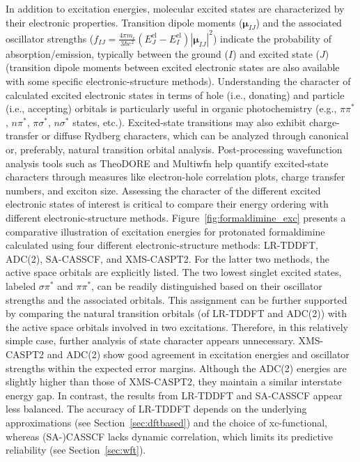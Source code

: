 \documentclass[9pt,bestpractices,pubversion]{livecoms}
\begin{document}
In addition to excitation energies, molecular excited states are characterized by their electronic properties. Transition dipole moments ($\boldsymbol{\mu}_{IJ}$) and the associated oscillator strengths ($f_{IJ}=\frac{4 \pi m_e }{3 \hbar e^2} (E_J^{\text{el}}-E_I^{\text{el}}) |\boldsymbol{\mu}_{IJ}|^2$) indicate the probability of absorption/emission, typically between the ground ($I$) and excited state ($J$) (transition dipole moments between excited electronic states are also available with some specific electronic-structure methods\cite{jacquemin2025betweenes}). Understanding the character of calculated excited electronic states in terms of hole (i.e., donating) and particle (i.e., accepting) orbitals is particularly useful in organic photochemistry (e.g., $\pi\pi^\ast$, $n\pi^\ast$, $\pi\sigma^\ast$, $n\sigma^\ast$ states, etc.). Excited-state transitions may also exhibit charge-transfer or diffuse Rydberg characters, which can be analyzed through canonical or, preferably, natural transition orbital analysis. Post-processing wavefunction analysis tools such as TheoDORE\cite{plasser2020theodore} and Multiwfn\cite{lu2024comprehensive} help quantify excited-state characters through measures like electron-hole correlation plots, charge transfer numbers, and exciton size. Assessing the character of the different excited electronic states of interest is critical to compare their energy ordering with different electronic-structure methods.
Figure~\ref{fig:formaldimine_exc} presents a comparative illustration of excitation energies for protonated formaldimine calculated using four different electronic-structure methods: LR-TDDFT, ADC(2), SA-CASSCF, and XMS-CASPT2. For the latter two methods, the active space orbitals are explicitly listed. The two lowest singlet excited states, labeled $\sigma\pi^\ast$ and $\pi\pi^\ast$, can be readily distinguished based on their oscillator strengths and the associated orbitals. This assignment can be further supported by comparing the natural transition orbitals (of LR-TDDFT and ADC(2)) with the active space orbitals involved in two excitations. Therefore, in this relatively simple case, further analysis of state character appears unnecessary. XMS-CASPT2 and ADC(2) show good agreement in excitation energies and oscillator strengths within the expected error margins. Although the ADC(2) energies are slightly higher than those of XMS-CASPT2, they maintain a similar interstate energy gap. In contrast, the results from LR-TDDFT and SA-CASSCF appear less balanced. The accuracy of LR-TDDFT depends on the underlying approximations (see Section~\ref{sec:dftbased}) and the choice of xc-functional, whereas (SA-)CASSCF lacks dynamic correlation, which limits its predictive reliability (see Section~\ref{sec:wft}).
\end{document}
